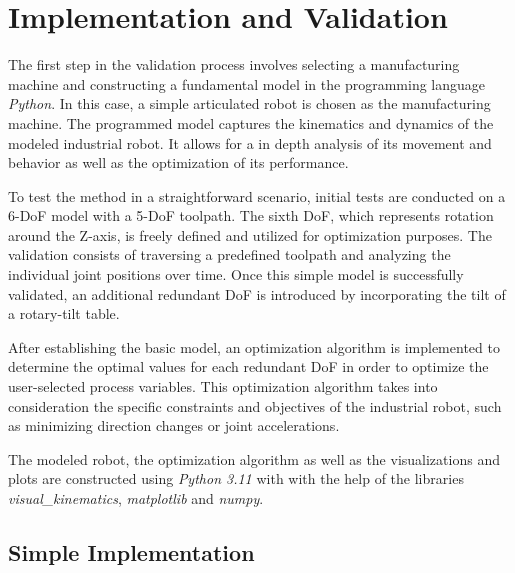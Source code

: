 \chapter{Implementation and Validation}%

The first step in the validation process involves selecting a manufacturing machine and constructing a fundamental model in the programming language \textit{Python}. In this case, a simple articulated robot is chosen as the manufacturing machine. The programmed model captures the kinematics and dynamics of the modeled industrial robot. It allows for a in depth analysis of its movement and behavior as well as the optimization of its performance. 

To test the method in a straightforward scenario, initial tests are conducted on a 6-\acrshort{DoF} model with a 5-\acrshort{DoF} toolpath. The sixth \acrshort{DoF}, which represents rotation around the Z-axis, is freely defined and utilized for optimization purposes. The validation consists of traversing a predefined toolpath and analyzing the individual joint positions over time. Once this simple model is successfully validated, an additional redundant \acrshort{DoF} is introduced by incorporating the tilt of a rotary-tilt table.

After establishing the basic model, an optimization algorithm is implemented to determine the optimal values for each redundant \acrshort{DoF} in order to optimize the user-selected process variables. This optimization algorithm takes into consideration the specific constraints and objectives of the industrial robot, such as minimizing direction changes or joint accelerations.

The modeled robot, the optimization algorithm as well as the visualizations and plots are constructed using \textit{Python 3.11} with with the help of the libraries \textit{visual\_kinematics}, \textit{matplotlib} and \textit{numpy}.



\section{Simple Implementation}%
